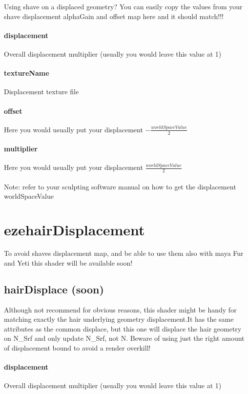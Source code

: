 \documentclass[final,letterpaper,twoside,12pt]{report}
\begin{document}
Using shave on a displaced geometry? You can easily copy the values from your shave displacement alphaGain and offset map here and it should match!!!

\subsubsection {displacement}
Overall displacement multiplier (usually you would leave this value at 1)
\smallskip
\subsubsection {textureName}
Displacement texture file
\smallskip
\subsubsection {offset}
Here you would usually put your displacement $-\frac{worldSpaceValue}{2}$
\smallskip
\subsubsection {multiplier}
Here you would usually put your displacement $\frac{worldSpaceValue}{2}$
\smallskip
\\
\\
Note: refer to your sculpting software manual on how to get the displacement worldSpaceValue


\chapter{ezehairDisplacement}

To avoid shaves displacement map, and be able to use them also with maya Fur and Yeti this shader will be available soon!

\section {hairDisplace (soon)}

Although not recommend for obvious reasons, this shader might be handy for matching exactly the hair underlying geometry displacement.It has the same attributes as the common displace, but this one will displace the hair geometry on N\_Srf and only update N\_Srf, not N.
Beware of using just the right amount of displacement bound to avoid a render overkill!

\subsubsection {displacement}
Overall displacement multiplier (usually you would leave this value at 1)
\smallskip
\end{document}
